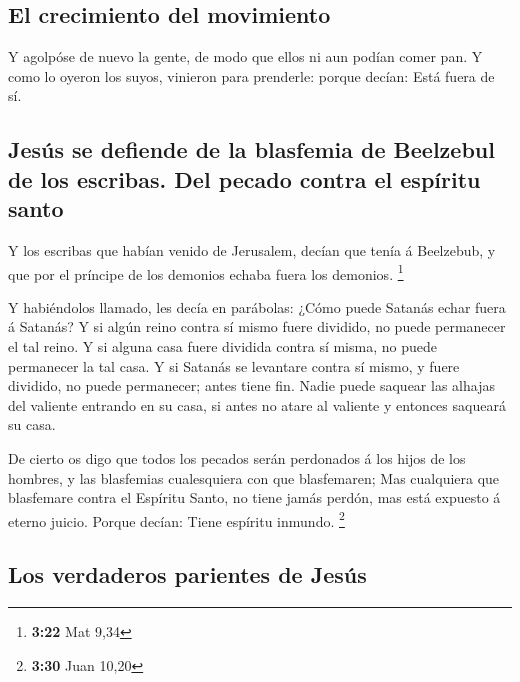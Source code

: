 \hypertarget{el-crecimiento-del-movimiento}{%
\subsection{El crecimiento del
movimiento}\label{el-crecimiento-del-movimiento}}

 Y agolpóse de nuevo la gente, de modo que ellos ni aun
podían comer pan.  Y como lo oyeron los suyos, vinieron
para prenderle: porque decían: Está fuera de sí.

\hypertarget{jesuxfas-se-defiende-de-la-blasfemia-de-beelzebul-de-los-escribas.-del-pecado-contra-el-espuxedritu-santo}{%
\subsection{Jesús se defiende de la blasfemia de Beelzebul de los
escribas. Del pecado contra el espíritu
santo}\label{jesuxfas-se-defiende-de-la-blasfemia-de-beelzebul-de-los-escribas.-del-pecado-contra-el-espuxedritu-santo}}

 Y los escribas que habían venido de Jerusalem, decían
que tenía á Beelzebub, y que por el príncipe de los demonios echaba
fuera los demonios. \footnote{\textbf{3:22} Mat 9,34}

 Y habiéndolos llamado, les decía en parábolas: ¿Cómo
puede Satanás echar fuera á Satanás?  Y si algún reino
contra sí mismo fuere dividido, no puede permanecer el tal reino.
 Y si alguna casa fuere dividida contra sí misma, no
puede permanecer la tal casa.  Y si Satanás se levantare
contra sí mismo, y fuere dividido, no puede permanecer; antes tiene fin.
 Nadie puede saquear las alhajas del valiente entrando en
su casa, si antes no atare al valiente y entonces saqueará su casa.

 De cierto os digo que todos los pecados serán perdonados
á los hijos de los hombres, y las blasfemias cualesquiera con que
blasfemaren;  Mas cualquiera que blasfemare contra el
Espíritu Santo, no tiene jamás perdón, mas está expuesto á eterno
juicio.  Porque decían: Tiene espíritu inmundo.
\footnote{\textbf{3:30} Juan 10,20}

\hypertarget{los-verdaderos-parientes-de-jesuxfas}{%
\subsection{Los verdaderos parientes de
Jesús}\label{los-verdaderos-parientes-de-jesuxfas}}


